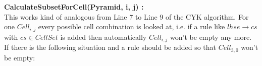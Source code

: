 \noindent \textbf{CalculateSubsetForCell(Pyramid, i, j) :}\\
This works kind of analogous from Line 7 to Line 9 of the CYK algorithm. For one $Cell_{i,j}$ every possible cell combination is looked at, i.e. if a rule like $lhse \rightarrow cs$ with $cs \in CellSet$ is added then automatically  $Cell_{i,j}$ won't be empty any more.\\

\noindent {}
If there is the following situation and a rule should be added so that $Cell_{3,0}$ won't be empty: 
\noindent
